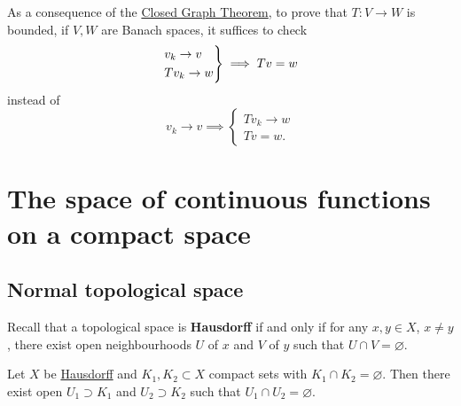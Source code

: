 \documentclass{article}
\renewcommand{\emptyset}{\varnothing}
\begin{document}
\begin{remark}
    As a consequence of the \hyperlink{thm:cgt}{Closed Graph Theorem}, to prove that $T: V \to W$ is bounded, if $V, W$ are Banach spaces, it suffices to check
    \begin{align*}
        \begin{rcases}
            v_k \to v \\
            Tv_k \to w
        \end{rcases}
        \implies Tv = w
    \end{align*}
    instead of
    \begin{equation*}
        v_k \to v \implies
        \begin{cases}
            T v_k \to w \\
            Tv = w.
        \end{cases}
    \end{equation*}
\end{remark}

\clearpage
\section{The space of continuous functions on a compact space}

\subsection{Normal topological space}
Recall that a topological space is \hypertarget{def:Hausdorff}{\textbf{Hausdorff}} if and only if for any $x, y \in X$, $x \neq y$, there exist open neighbourhoods $U$ of $x$ and $V$ of $y$ such that $U \cap V = \emptyset$.

\begin{prop}
    Let $X$ be \hyperlink{def:Hausdorff}{Hausdorff} and $K_1, K_2 \subset X$ compact sets with $K_1 \cap K_2 = \emptyset$.
    Then there exist open $U_1 \supset K_1$ and $U_2 \supset K_2$ such that $U_1 \cap U_2 = \emptyset$.
\end{prop}
\end{document}
